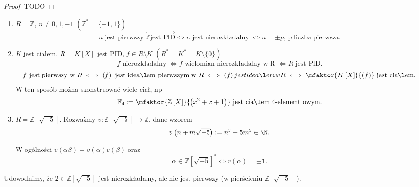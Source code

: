 \begin{proof}
	TODO
\end{proof} 
\begin{eg}
	\begin{enumerate}[label=\arabic*)]
		\item $R = \mathbb{Z} $, $n\neq 0,1,-1$ $\left( \mathbb{Z} ^{\ast} = \{-1,1\}  \right) $
			 \[
			 n\text{ jest pierwszy } \overset{\iff}{\mathbb{Z} \text{jest PID}} \iff n \text{ jest nierozkładalny } \iff n = \pm p\text{, p liczba pierwsza}
			 .\] 
		 \item $K$ jest ciałem, $R = K\left[ X \right] $ jest PID, $f\in R\setminus K$ $\left( R^{\ast}  = K^{\ast} = K\setminus \{\mathbf{0}\}  \right) $ 
\[
f\text{ nierozkładalny }\iff f \text{ wielomian nierozkładalny w R } \iff R \text{ jest PID}
.\] 
\[
f \text{ jest pierwszy w } R \iff  \left( f \right) \text{ jest ideałem pierwszym w } R \iff \left( f \right) jest ideałem w R \iff \mfaktor{K\left[ X \right] }{\left( f \right) } \text{ jest ciałem}
.\] 
W ten sposób można skonstruować wiele ciał, np \[
	\mathbb{F} _{4} := \mfaktor{\mathbb{Z} \left[ X \right] }{\left( x^2+x+1 \right) } \text{ jest ciałem 4-element owym}
.\] 
\item $R = \mathbb{Z} \left[ \sqrt{-5}  \right] $. Rozważmy $v: \mathbb{Z} \left[ \sqrt{-5}  \right] \to \mathbb{Z} $, dane wzorem 
	\[
	v\left( n+ m\sqrt{-5}  \right) := n^2 - 5m^2 \in \N
	.\]

	W ogólności $v\left( \alpha \beta  \right) = v\left( \alpha  \right) v\left( \beta  \right) $ oraz 
	 \[
	\alpha \in \mathbb{Z} \left[ \sqrt{-5}  \right] ^{\ast} \iff v\left( \alpha  \right) = \pm \mathbf{1}
	.\] 
	\end{enumerate}
\end{eg} 
Udowodnimy, że $2\in \mathbb{Z} \left[ \sqrt{-5}  \right] $ jest nierozkładalny, ale nie jest pierwszy (w pierścieniu $\mathbb{Z} \left[ \sqrt{-5}  \right] $ ).

